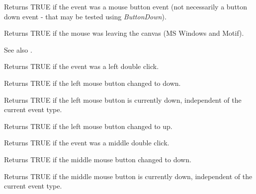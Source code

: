 

Returns TRUE if the event was a mouse button event (not necessarily a button down event -
that may be tested using {\it ButtonDown}).

\label{leaving}


Returns TRUE if the mouse was leaving the canvas (MS Windows and Motif).

See also .



Returns TRUE if the event was a left double click.



Returns TRUE if the left mouse button changed to down.



Returns TRUE if the left mouse button is currently down, independent
of the current event type.



Returns TRUE if the left mouse button changed to up.



Returns TRUE if the event was a middle double click.



Returns TRUE if the middle mouse button changed to down.



Returns TRUE if the middle mouse button is currently down, independent
of the current event type.


